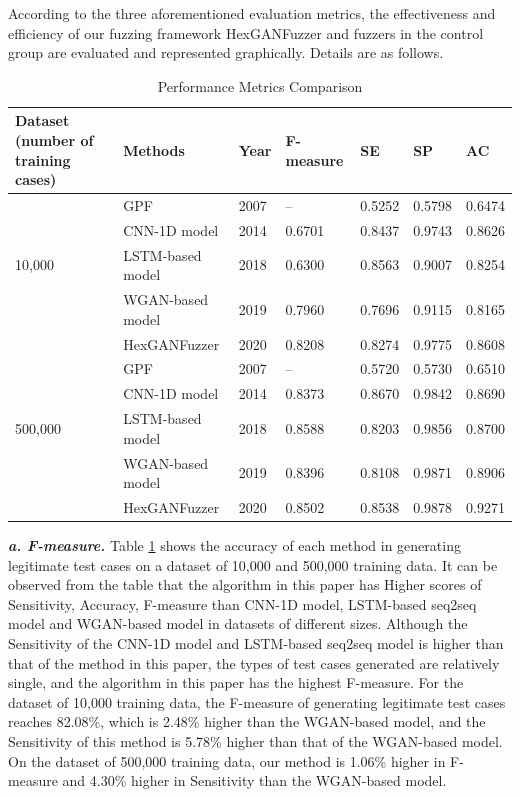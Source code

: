 According to the three aforementioned evaluation metrics, the effectiveness and efficiency of our fuzzing framework HexGANFuzzer and fuzzers in the control group are evaluated and represented graphically. Details are as follows.  

\begin{table}[]
	\centering
	\caption{Performance Metrics Comparison}
	\label{F-measure}
	\renewcommand{\arraystretch}{1.35}
	\begin{tabular}{ m{70pt}<{\centering} |m{70pt}<{\centering}|m{40pt}<{\centering}|m{60pt}<{\centering}|m{40pt}<{\centering}|m{40pt}<{\centering}|m{40pt}<{\centering}}
		\toprule
		\textbf{Dataset
			(number of training cases)} & \textbf{Methods}          & \textbf{Year} & \textbf{F-measure} & \textbf{SE}     & \textbf{SP}     & \textbf{AC}     \\ \midrule
		& GPF              & 2007 & --         & 0.5252 & 0.5798 & 0.6474 \\ \cmidrule(l){2-7} 
		& CNN-1D model     & 2014 & 0.6701    & 0.8437 & 0.9743 & 0.8626 \\ \cmidrule(l){2-7} 
		10,000  & LSTM-based model & 2018 & 0.6300    & 0.8563 & 0.9007 & 0.8254 \\ \cmidrule(l){2-7} 
		& WGAN-based model & 2019 & 0.7960    & 0.7696 & 0.9115 & 0.8165 \\ \cmidrule(l){2-7} 
		& HexGANFuzzer      & 2020 & 0.8208    & 0.8274 & 0.9775 & 0.8608 \\ \midrule
		& GPF              & 2007 & --         & 0.5720 & 0.5730 & 0.6510 \\ \cmidrule(l){2-7} 
		& CNN-1D model     & 2014 & 0.8373    & 0.8670 & 0.9842 & 0.8690 \\ \cmidrule(l){2-7} 
		500,000 & LSTM-based model & 2018 & 0.8588    & 0.8203 & 0.9856 & 0.8700 \\ \cmidrule(l){2-7} 
		& WGAN-based model & 2019 & 0.8396    & 0.8108 & 0.9871 & 0.8906 \\ \cmidrule(l){2-7} 
		& HexGANFuzzer      & 2020 & 0.8502    & 0.8538 & 0.9878 & 0.9271 \\ \bottomrule
	\end{tabular}
\end{table}

\quad \textit{\textbf{a. F-measure.}} Table \ref{F-measure} shows the accuracy of each method in generating legitimate test cases on a dataset of 10,000 and 500,000 training data. It can be observed from the table that the algorithm in this paper has Higher scores of Sensitivity, Accuracy, F-measure than CNN-1D model, LSTM-based seq2seq model and WGAN-based model in datasets of different sizes. Although the Sensitivity of the CNN-1D model and LSTM-based seq2seq model is higher than that of the method in this paper, the types of test cases generated are relatively single, and the algorithm in this paper has the highest F-measure. For the dataset of 10,000 training data, the F-measure of generating legitimate test cases reaches 82.08\%, which is 2.48\% higher than the WGAN-based model, and the Sensitivity of this method is 5.78\% higher than that of the WGAN-based model. On the dataset of 500,000 training data, our method is 1.06\% higher in F-measure and 4.30\% higher in Sensitivity than the WGAN-based model. 

